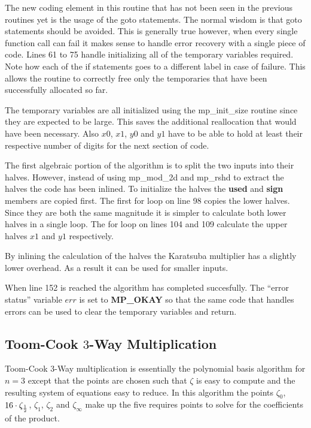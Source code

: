 \documentclass[b5paper]{book}
\begin{document}
The new coding element in this routine that has not been seen in the previous routines yet is the usage of the goto statements.  The normal
wisdom is that goto statements should be avoided.  This is generally true however, when every single function call can fail it makes sense
to handle error recovery with a single piece of code.  Lines 61 to 75 handle initializing all of the temporary variables 
required.  Note how each of the if statements goes to a different label in case of failure.  This allows the routine to correctly free only
the temporaries that have been successfully allocated so far.

The temporary variables are all initialized using the mp\_init\_size routine since they are expected to be large.  This saves the 
additional reallocation that would have been necessary.  Also $x0$, $x1$, $y0$ and $y1$ have to be able to hold at least their respective
number of digits for the next section of code.

The first algebraic portion of the algorithm is to split the two inputs into their halves.  However, instead of using mp\_mod\_2d and mp\_rshd
to extract the halves the code has been inlined.  To initialize the halves the \textbf{used} and \textbf{sign} members are copied first.  The first
for loop on line 98 copies the lower halves.  Since they are both the same magnitude it is simpler to calculate both lower halves in a single
loop.  The for loop on lines 104 and 109 calculate the upper halves $x1$ and $y1$ respectively.

By inlining the calculation of the halves the Karatsuba multiplier has a slightly lower overhead.  As a result it can be used for smaller 
inputs.

When line 152 is reached the algorithm has completed succesfully.  The ``error status'' variable $err$ is set to \textbf{MP\_OKAY} so that
the same code that handles errors can be used to clear the temporary variables and return.  

\subsection{Toom-Cook $3$-Way Multiplication}
Toom-Cook $3$-Way multiplication \cite{TOOM} is essentially the polynomial basis algorithm for $n = 3$ except that the points  are 
chosen such that $\zeta$ is easy to compute and the resulting system of equations easy to reduce.  In this algorithm the points $\zeta_{0}$, 
$16 \cdot \zeta_{1 \over 2}$, $\zeta_1$, $\zeta_2$ and $\zeta_{\infty}$ make up the five requires points to solve for the coefficients of the
product.  
\end{document}
